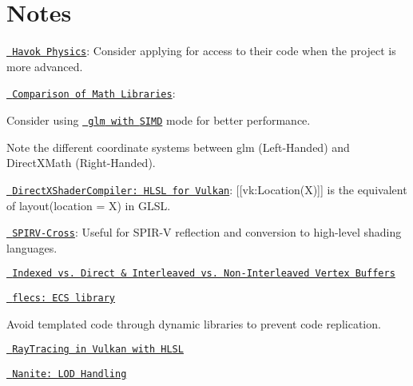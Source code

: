 \chapter{Notes}
\hypertarget{md_markdown_2_notes}{}\label{md_markdown_2_notes}
\label{md_markdown_2_notes_autotoc_md0}%
%



\begin{DoxyItemize}
\item \href{https://www.havok.com/havok-physics/}{\texttt{ Havok Physics}}\+: Consider applying for access to their code when the project is more advanced.
\item \href{https://bargor.github.io/Comparison-of-3d-math-libraries/}{\texttt{ Comparison of Math Libraries}}\+:
\begin{DoxyItemize}
\item Consider using \href{https://glm.g-truc.net/0.9.1/api/a00002.html}{\texttt{ {\ttfamily glm} with {\ttfamily SIMD}}} mode for better performance.
\item Note the different coordinate systems between {\ttfamily glm} (Left-\/\+Handed) and {\ttfamily Direct\+XMath} (Right-\/\+Handed).
\end{DoxyItemize}
\item \href{https://github.com/microsoft/DirectXShaderCompiler/blob/main/docs/SPIR-V.rst\#hlsl-semantic-and-vulkan-location}{\texttt{ Direct\+XShader\+Compiler\+: HLSL for Vulkan}}\+: {\ttfamily \mbox{[}\mbox{[}vk\+:Location(\+X)\mbox{]}\mbox{]}} is the equivalent of {\ttfamily layout(location = X)} in GLSL.
\item \href{https://github.com/KhronosGroup/SPIRV-Cross}{\texttt{ SPIRV-\/\+Cross}}\+: Useful for {\ttfamily SPIR-\/V} reflection and conversion to high-\/level shading languages.
\item \href{https://stackoverflow.com/questions/17503787/vertex-buffers-indexed-or-direct-interlaced-or-separate}{\texttt{ Indexed vs. Direct \& Interleaved vs. Non-\/\+Interleaved Vertex Buffers}}
\item \href{https://github.com/SanderMertens/flecs}{\texttt{ flecs\+: ECS library}}
\item Avoid templated code through dynamic libraries to prevent code replication.
\item \href{https://github.com/microsoft/DirectXShaderCompiler/blob/9c6b2c1275e41cc385b2034aa2716ec2303a62d6/docs/SPIR-V.rst\#raytracing-in-vulkan-and-spirv}{\texttt{ Ray\+Tracing in Vulkan with HLSL}}
\item \href{https://advances.realtimerendering.com/s2021/Karis_Nanite_SIGGRAPH_Advances_2021_final.pdf}{\texttt{ Nanite\+: LOD Handling}} 
\end{DoxyItemize}